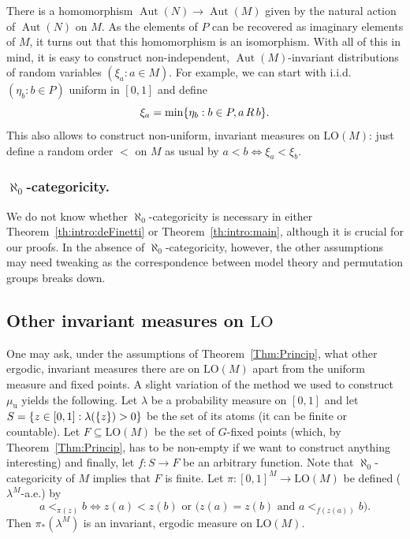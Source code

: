 \documentclass[JEP,XML,SOM,Unicode,published]{cedram}
\let\sub\subseteq
\theoremstyle{plain}
\theoremstyle{definition}
\DeclareMathOperator{\Aut}{Aut}
\DeclarePairedDelimiter\set{\{}{\}}
\newcommand{\LO}{\mathrm{LO}}
\newcommand{\muu}{\mu_{\mathrm{u}}}
\renewcommand{\And}{\text{ and }}
\newcommand{\Or}{\text{ or }}
\newcommand{\eqrel}[1]{\,#1\,}
\begin{document}
There is a homomorphism $\Aut(N) \to \Aut(M)$ given by the natural action of $\Aut(N)$ on $M$. As the elements of $P$ can be recovered as imaginary elements of $M$, it turns out that this homomorphism is an isomorphism. With all of this in mind, it is easy to construct non-independent, $\Aut(M)$-invariant distributions of random variables $(\xi_a : a \in M)$. For example, we can start with i.i.d. $(\eta_b : b \in P)$ uniform in $[0, 1]$ and define
\begin{equation*}
\xi_a = \min \set{\eta_b : b \in P, a \eqrel{R} b}.
\end{equation*}
This also allows to construct non-uniform, invariant measures on $\LO(M)$: just define a random order $<$ on $M$ as usual by $a < b \iff \xi_a < \xi_b$.

\subsubsection*{$\aleph_0$-categoricity.} We do not know whether $\aleph_0$-categoricity is necessary in either Theorem~\ref{th:intro:deFinetti} or Theorem~\ref{th:intro:main}, although it is crucial for our proofs. In the absence of $\aleph_0$-categoricity, however, the other assumptions may need tweaking as the correspondence between model theory and permutation groups breaks down.

\subsection{Other invariant measures on $\LO$}
\label{sec:other-invar-meas}

One may ask, under the assumptions of Theorem~\ref{Thm:Princip}, what other ergodic, invariant measures there are on $\LO(M)$ apart from the uniform measure and fixed points. A slight variation of the method we used to construct $\muu$ yields the following. Let $\lambda$ be a probability measure on $[0, 1]$ and let $S = \set{z \in [0, 1] : \lambda(\set{z}) > 0}$ be the set of its atoms (it can be finite or countable). Let $F \sub \LO(M)$ be the set of $G$-fixed points (which, by Theorem~\ref{Thm:Princip}, has to be non-empty if we want to construct anything interesting) and finally, let $f \colon S \to F$ be an arbitrary function. Note that $\aleph_0$-categoricity of $M$ implies that $F$ is finite. Let $\pi \colon [0, 1]^M \to \LO(M)$ be defined ($\lambda^M$-a.e.) by
\begin{equation*}
a <_{\pi(z)} b \iff z(a) < z(b) \Or \big( z(a) = z(b) \And a <_{f(z(a))} b \big).
\end{equation*}
Then $\pi_*(\lambda^M)$ is an invariant, ergodic measure on $\LO(M)$.
\end{document}
